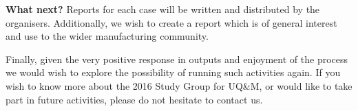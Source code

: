 \documentclass[11pt]{article}%
\begin{document}
\begin{minipage}[t]{.99\linewidth}
\begin{multicols}{2}


{\bf What next?}
Reports for each case will be written and distributed by the organisers. Additionally, we wish to create a report which is of general interest and use to the wider manufacturing community.

Finally, given the very positive response in outputs and enjoyment of the process we would wish to explore the possibility of running such activities again. If you wish to know more about the 2016 Study Group for UQ\&M, or would like to take part in future activities, please do not hesitate to contact us.


\end{multicols}
\end{minipage}













\end{document}
